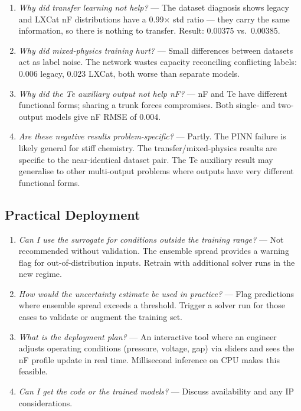 \documentclass[12pt,a4paper]{article}
\begin{document}
\begin{enumerate}[1.]
  \item \emph{Why did transfer learning not help?} ---
    The dataset diagnosis shows legacy and LXCat nF distributions have
    a 0.99$\times$ std ratio --- they carry the same information, so
    there is nothing to transfer. Result: 0.00375 vs.\ 0.00385.

  \item \emph{Why did mixed-physics training hurt?} ---
    Small differences between datasets act as label noise. The network
    wastes capacity reconciling conflicting labels: 0.006 legacy,
    0.023 LXCat, both worse than separate models.

  \item \emph{Why did the Te auxiliary output not help nF?} ---
    nF and Te have different functional forms; sharing a trunk forces
    compromises. Both single- and two-output models give nF RMSE of
    0.004.

  \item \emph{Are these negative results problem-specific?} ---
    Partly. The PINN failure is likely general for stiff chemistry.
    The transfer/mixed-physics results are specific to the near-identical
    dataset pair. The Te auxiliary result may generalise to other
    multi-output problems where outputs have very different functional
    forms.
\end{enumerate}

\subsection*{Practical Deployment}

\begin{enumerate}[1.]
  \item \emph{Can I use the surrogate for conditions outside the
    training range?} ---
    Not recommended without validation. The ensemble spread provides a
    warning flag for out-of-distribution inputs. Retrain with
    additional solver runs in the new regime.

  \item \emph{How would the uncertainty estimate be used in practice?} ---
    Flag predictions where ensemble spread exceeds a threshold.
    Trigger a solver run for those cases to validate or augment the
    training set.

  \item \emph{What is the deployment plan?} ---
    An interactive tool where an engineer adjusts operating conditions
    (pressure, voltage, gap) via sliders and sees the nF profile update
    in real time. Millisecond inference on CPU makes this feasible.

  \item \emph{Can I get the code or the trained models?} ---
    Discuss availability and any IP considerations.
\end{enumerate}
\end{document}
